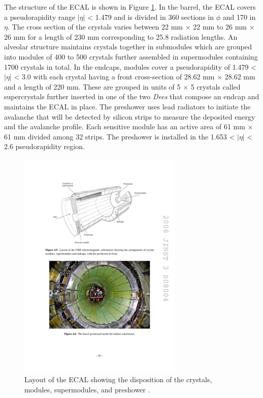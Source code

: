     The structure of the ECAL is shown in Figure \ref{fig:I-3-ecal}. In the barrel, the ECAL covers a pseudorapidity range $ | \eta | $ < 1.479 and is divided in 360 sections in $ \phi $ and 170 in $ \eta $. The cross section of the crystals varies between 22 mm $ \times $ 22 mm to 26 mm $ \times $ 26 mm for a length of 230 mm corresponding to 25.8 radiation lengths. An alveolar structure maintains crystals together in submodules which are grouped into modules of 400 to 500 crystals further assembled in supermodules containing 1700 crystals in total. In the endcaps, modules cover a pseudorapidity of 1.479 < $ | \eta | $ < 3.0 with each crystal having a front cross-section of 28.62 mm $ \times $ 28.62 mm and a length of 220 mm. These are grouped in units of 5 $ \times $ 5 crystals called supercrystals further inserted in one of the two \emph{Dees} that compose an endcap and maintains the ECAL in place. The preshower uses lead radiators to initiate the avalanche that will be detected by silicon strips to measure the deposited energy and the avalanche profile. Each sensitive module has an active area of 61 mm $\times$ 61 mm divided among 32 strips. The preshower is installed in the 1.653 < $ | \eta | $ < 2.6 pseudorapidity region. \\

    \begin{figure}[h!]
      \centering
      \includegraphics[width=0.7\textwidth]{img/I-3-cms/ecal.pdf}
      \caption{Layout of the ECAL showing the disposition of the crystals, modules, supermodules, and preshower \cite{1748-0221-3-08-S08004}.}
      \label{fig:I-3-ecal}
    \end{figure}

